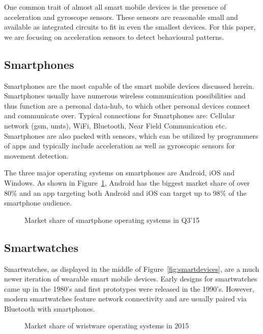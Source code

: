 One common trait of almost all smart mobile devices is the presence of acceleration and gyroscope sensors. These sensors are reasonable small and available as integrated circuits to fit in even the smallest devices. For this paper, we are focusing on acceleration sensors to detect behavioural patterns.

\subsection{Smartphones}
Smartphones are the most capable of the smart mobile devices discussed herein. Smartphones usually have numerous wireless communication possibilities and thus function are a personal data-hub, to which other personal devices connect and communicate over. Typical connections for Smartphones are: Cellular network (\eg \acrshort{gsm}, \acrshort{umts}), WiFi, Bluetooth, Near Field Communication etc. Smartphones are also packed with sensors, which can be utilized by programmers of \Glspl{app} and typically include acceleration as well as gyroscopic sensors for movement detection.

The three major operating systems on smartphones are Android, iOS and Windows. As shown in Figure~\ref{fig:smartphoneosmarketshare}, Android has the biggest market share of over 80\% and an \gls{app} targeting both Android and iOS can target up to 98\% of the smartphone audience.

\begin{figure}
    \centering
    
    \caption{Market share of smartphone operating systems in Q3'15\cite{gartner2015smartosmarketshare}}
    \label{fig:smartphoneosmarketshare}
\end{figure}

\subsection{Smartwatches}
Smartwatches, as displayed in the middle of Figure~\ref{fig:smartdevices}, are a much newer iteration of wearable smart mobile devices. Early designs for smartwatches came up in the 1980's and first prototypes were released in the 1990's. However, modern smartwatches feature network connectivity and are usually paired via Bluetooth with smartphones.

\begin{figure}
    \centering
    
    \caption{Market share of wristware operating systems in 2015\cite{idc2015wristmarketshare}}
    \label{fig:my_label}
\end{figure}

